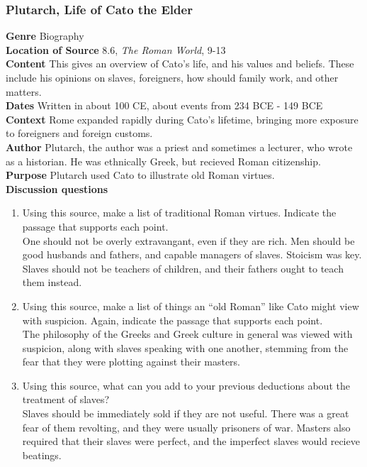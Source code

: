 \documentclass{article}
\begin{document}
\subsubsection*{Plutarch, Life of Cato the Elder}
\textbf{Genre}
Biography \\
\textbf{Location of Source}
8.6, \textit{The Roman World}, 9-13 \\
\textbf{Content}
This gives an overview of Cato's life, and his values and beliefs. These include his opinions
on slaves, foreigners, how should family work, and other matters.\\
\textbf{Dates}
Written in about 100 CE, about events from 234 BCE - 149 BCE \\
\textbf{Context}
Rome expanded rapidly during Cato’s lifetime, bringing more exposure to foreigners and
foreign customs. \\
\textbf{Author}
Plutarch, the author was a priest and sometimes a lecturer, who wrote as a historian. He was
ethnically Greek, but recieved Roman citizenship. \\
\textbf{Purpose}
Plutarch used Cato to illustrate old Roman virtues. \\
\textbf{Discussion questions}
\begin{enumerate}
  \item Using this source, make a list of traditional Roman virtues. Indicate the passage
  that supports each point. \\
  One should not be overly extravangant, even if they are rich. Men should be good husbands
  and fathers, and capable managers of slaves. Stoicism was key. Slaves should not be teachers
  of children, and their fathers ought to teach them instead.
  \item Using this source, make a list of things an “old Roman” like Cato might view with
  suspicion. Again, indicate the passage that supports each point. \\
  The philosophy of the Greeks and Greek culture in general was viewed with suspicion, along
  with slaves speaking with one another, stemming from the fear that they were plotting against
  their masters.
  \item Using this source, what can you add to your previous deductions about the treatment
  of slaves? \\
  Slaves should be immediately sold if they are not useful. There was a great fear of them
  revolting, and they were usually prisoners of war. Masters also required that  their slaves
  were perfect, and the imperfect slaves would recieve beatings.
\end{enumerate}
\end{document}
